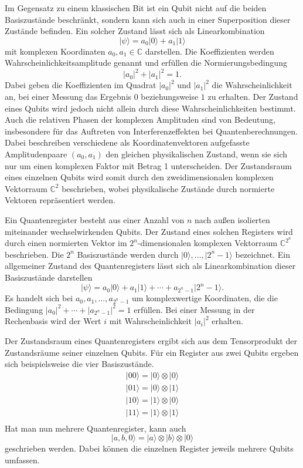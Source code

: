 Im Gegensatz zu einem klassischen Bit ist ein Qubit nicht auf die beiden Basiszustände beschränkt, sondern kann sich auch in einer Superposition dieser Zustände befinden. Ein solcher Zustand lässt sich als Linearkombination
\[
    \lvert\psi\rangle
    =a_0\lvert 0\rangle+a_1\lvert 1\rangle
\]
mit komplexen Koordinaten $a_0,a_1\in\mathbb{C}$ darstellen. Die Koeffizienten werden Wahrscheinlichkeitsamplitude genannt und erfüllen die Normierungsbedingung
\[
    \lvert a_0\lvert ^2+ \lvert a_1\lvert ^2=1.
\]
Dabei geben die Koeffizienten im Quadrat $|a_0|^2$ und $|a_1|^2$ die Wahrscheinlichkeit an, bei einer Messung das Ergebnis $0$ beziehungsweise $1$ zu erhalten. Der Zustand eines Qubits wird jedoch nicht allein durch diese Wahrscheinlichkeiten bestimmt.
Auch die relativen Phasen der komplexen Amplituden sind von Bedeutung, insbesondere für das Auftreten von Interferenzeffekten bei Quantenberechnungen. Dabei beschreiben verschiedene als Koordinatenvektoren aufgefasste Amplitudenpaare \((a_0,a_1)\) den gleichen physikalischen Zustand, wenn sie sich nur um einen komplexen Faktor mit Betrag 1 unterscheiden. Der Zustandsraum eines einzelnen Qubits wird somit durch den zweidimensionalen komplexen Vektorraum \(\mathbb C^2\) beschrieben, wobei physikalische Zustände durch normierte Vektoren repräsentiert werden.
\begin{definition}[Quantenregister]
    Ein Quantenregister besteht aus einer Anzahl von $n$ nach außen isolierten miteinander wechselwirkenden Qubits. Der Zustand eines solchen Registers wird durch einen normierten Vektor im $2^n$-dimensionalen komplexen Vektorraum $\mathbb{C}^{2^n}$ beschrieben. Die \(2^n\) Basiszustände werden durch \(\lvert 0\rangle,\ldots,\lvert 2^n-1\rangle\) bezeichnet. Ein allgemeiner Zustand des Quantenregisters lässt sich als Linearkombination dieser Basiszustände darstellen
\[
    \lvert \psi \rangle = a_0 \lvert 0 \rangle + a_1 \lvert 1 \rangle + \cdots +a_{2^n-1} \lvert 2^n-1 \rangle.
\]
Es handelt sich bei $a_0,a_1,\dots, a_{2^n-1}$ um komplexwertige Koordinaten, die die Bedingung \( \lvert a_0\lvert^2+\cdots+\lvert a_{2^n-1}\lvert ^2=1\) erfüllen.
Bei einer Messung in der Rechenbasis wird der Wert $i$ mit Wahrscheinlichkeit $|a_i|^2$
erhalten.
\end{definition}
Der Zustandsraum eines Quantenregisters ergibt sich aus dem Tensorprodukt der Zustandsräume
seiner einzelnen Qubits. Für ein Register aus zwei Qubits ergeben sich beispielsweise die
vier Basiszustände.
\begin{align*}
    \lvert 00\rangle = \lvert 0 \rangle  \otimes \lvert 0 \rangle \\
    \lvert 01\rangle = \lvert 0 \rangle  \otimes \lvert 1 \rangle \\
    \lvert 10\rangle = \lvert 1 \rangle  \otimes \lvert 0 \rangle \\
    \lvert 11\rangle = \lvert 1 \rangle  \otimes \lvert 1 \rangle \\
\end{align*}
Hat man nun mehrere Quantenregister, kann auch
\[
    |a,b,0\rangle
    = |a\rangle \otimes |b\rangle \otimes |0\rangle
\]
geschrieben werden. Dabei können die einzelnen Register jeweils mehrere Qubits umfassen.

